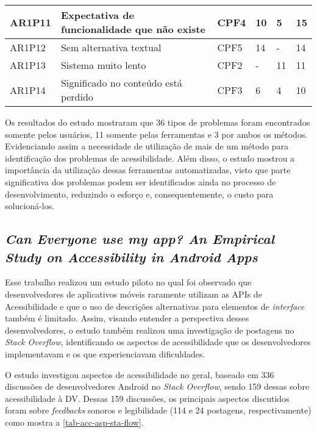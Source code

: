 \begin{table}[htb]
\begin{center}
\begin{tabular}{p{1.2cm}|p{8.7cm}|p{1.4cm}|p{0.6cm}|p{0.6cm}|p{0.7cm}}
      \hline
      AR1P11          & Expectativa de funcionalidade que não existe                            & CPF4               & 10           & 5            & 15             \\
      \hline
      AR1P12          & Sem alternativa textual                                                 & CPF5               & 14           & -            & 14             \\
      \hline
      AR1P13          & Sistema muito lento                                                     & CPF2               & -            & 11           & 11             \\
      \hline
      AR1P14          & Significado no conteúdo está perdido                                    & CPF3               & 6            & 4            & 10             \\
    \end{tabular}
  \end{center}
\end{table}

Os resultados do estudo mostraram que 36 tipos de problemas foram encontrados somente pelos usuários, 11 somente pelas ferramentas e 3 por ambos os métodos.
Evidenciando assim a necessidade de utilização de mais de um método para identificação dos problemas de acessibilidade.
Além disso, o estudo mostrou a importância da utilização dessas ferramentas automatizadas, visto que parte significativa dos problemas podem ser identificados ainda no processo de desenvolvimento, reduzindo o esforço e, consequentemente, o custo para solucioná-los.

\subsection{\emph{Can Everyone use my app? An Empirical Study on Accessibility in Android Apps}}

Esse trabalho realizou um estudo piloto no qual foi observado que desenvolvedores de aplicativos móveis raramente utilizam as APIs de Acessibilidade e que o uso de descrições alternativas para elementos de \emph{interface} também é limitado.
Assim, visando entender a perspectiva desses desenvolvedores, o estudo também realizou uma investigação de postagens no \emph{Stack Overflow}, identificando os aspectos de acessibilidade que os desenvolvedores implementavam e os que experienciavam dificuldades.

O estudo investigou aspectos de acessibilidade no geral, baseado em 336 discussões de desenvolvedores Android no \emph{Stack Overflow}, sendo 159 dessas sobre acessibilidade à DV\@.
Dessas 159 discussões, os principais aspectos discutidos foram sobre \emph{feedbacks} sonoros e legibilidade (114 e 24 postagens, respectivamente) como mostra a \autoref{tab-acc-asp-sta-flow}.

